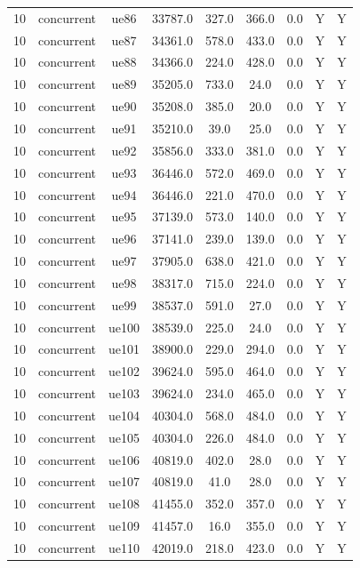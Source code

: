 \begin{table}[ht]
\begin{tabular}{|c|c|c|c|c|c|c|c|c|}
10 & concurrent & ue86 & 33787.0 & 327.0 & 366.0 & 0.0 & Y & Y \\
10 & concurrent & ue87 & 34361.0 & 578.0 & 433.0 & 0.0 & Y & Y \\
10 & concurrent & ue88 & 34366.0 & 224.0 & 428.0 & 0.0 & Y & Y \\
10 & concurrent & ue89 & 35205.0 & 733.0 & 24.0 & 0.0 & Y & Y \\
10 & concurrent & ue90 & 35208.0 & 385.0 & 20.0 & 0.0 & Y & Y \\
10 & concurrent & ue91 & 35210.0 & 39.0 & 25.0 & 0.0 & Y & Y \\
10 & concurrent & ue92 & 35856.0 & 333.0 & 381.0 & 0.0 & Y & Y \\
10 & concurrent & ue93 & 36446.0 & 572.0 & 469.0 & 0.0 & Y & Y \\
10 & concurrent & ue94 & 36446.0 & 221.0 & 470.0 & 0.0 & Y & Y \\
10 & concurrent & ue95 & 37139.0 & 573.0 & 140.0 & 0.0 & Y & Y \\
10 & concurrent & ue96 & 37141.0 & 239.0 & 139.0 & 0.0 & Y & Y \\
10 & concurrent & ue97 & 37905.0 & 638.0 & 421.0 & 0.0 & Y & Y \\
10 & concurrent & ue98 & 38317.0 & 715.0 & 224.0 & 0.0 & Y & Y \\
10 & concurrent & ue99 & 38537.0 & 591.0 & 27.0 & 0.0 & Y & Y \\
10 & concurrent & ue100 & 38539.0 & 225.0 & 24.0 & 0.0 & Y & Y \\
10 & concurrent & ue101 & 38900.0 & 229.0 & 294.0 & 0.0 & Y & Y \\
10 & concurrent & ue102 & 39624.0 & 595.0 & 464.0 & 0.0 & Y & Y \\
10 & concurrent & ue103 & 39624.0 & 234.0 & 465.0 & 0.0 & Y & Y \\
10 & concurrent & ue104 & 40304.0 & 568.0 & 484.0 & 0.0 & Y & Y \\
10 & concurrent & ue105 & 40304.0 & 226.0 & 484.0 & 0.0 & Y & Y \\
10 & concurrent & ue106 & 40819.0 & 402.0 & 28.0 & 0.0 & Y & Y \\
10 & concurrent & ue107 & 40819.0 & 41.0 & 28.0 & 0.0 & Y & Y \\
10 & concurrent & ue108 & 41455.0 & 352.0 & 357.0 & 0.0 & Y & Y \\
10 & concurrent & ue109 & 41457.0 & 16.0 & 355.0 & 0.0 & Y & Y \\
10 & concurrent & ue110 & 42019.0 & 218.0 & 423.0 & 0.0 & Y & Y \\

\end{tabular}
\end{table}
